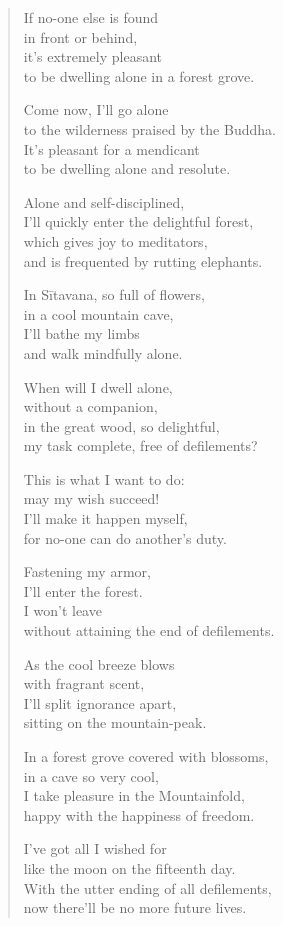 \documentclass[12pt,openany]{book}%
\begin{document}
\begin{verse}%
If no-one else is found \\
in front or behind, \\
it’s extremely pleasant \\
to be dwelling alone in a forest grove. 

Come now, I’ll go alone \\
to the wilderness praised by the Buddha. \\
It’s pleasant for a mendicant \\
to be dwelling alone and resolute. 

Alone and self-disciplined, \\
I’ll quickly enter the delightful forest, \\
which gives joy to meditators, \\
and is frequented by rutting elephants. 

In \textsanskrit{Sītavana}, so full of flowers, \\
in a cool mountain cave, \\
I’ll bathe my limbs \\
and walk mindfully alone. 

When will I dwell alone, \\
without a companion, \\
in the great wood, so delightful, \\
my task complete, free of defilements? 

This is what I want to do: \\
may my wish succeed! \\
I’ll make it happen myself, \\
for no-one can do another’s duty. 

Fastening my armor, \\
I’ll enter the forest. \\
I won’t leave \\
without attaining the end of defilements. 

As the cool breeze blows \\
with fragrant scent, \\
I’ll split ignorance apart, \\
sitting on the mountain-peak. 

In a forest grove covered with blossoms, \\
in a cave so very cool, \\
I take pleasure in the Mountainfold, \\
happy with the happiness of freedom. 

I’ve got all I wished for \\
like the moon on the fifteenth day. \\
With the utter ending of all defilements, \\
now there’ll be no more future lives. 

%
\end{verse}
\end{document}
